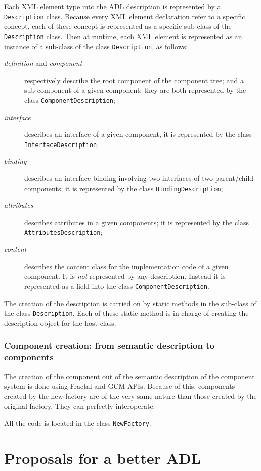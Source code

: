 \documentclass{article}
\newcommand{\code}[1]{\texttt{#1}}
\newcommand{\xml}[1]{\textsl{#1}}
\begin{document}
Each XML element type into the ADL description is represented by a  \code{Description} class.
Because every XML element declaration refer to a specific concept, each of these concept is represented
as a specific sub-class of the \code{Description} class.
Then at runtime, each XML element is represented as an instance of a sub-class of the class  \code{Description}, as follows:
\begin{description}
\item[\xml{definition} and \xml{component}] respectively describe  the root component of the component tree;
and a sub-component of a given component; they are both represented by the class \code{ComponentDescription};
\item[\xml{interface}] describes an interface of a given component, it is represented by the class \code{InterfaceDescription};
\item[\xml{binding}] describes an interface binding involving two interfaces of two parent/child components;
it is represented by the class \code{BindingDescription};
\item[\xml{attributes}] describes attributes in a given components; it is represented by the class \code{AttributesDescription};
\item[\xml{content}] describes the content class for the implementation code of a given component. It is
{\em not} represented by any description. Instead it is represented as a field into the class \code{ComponentDescription}.
\end{description}

The creation of the description is carried on by static methods in the sub-class of the class \code{Description}.
Each of these static method is in charge of creating the description object for the host class.

\subsubsection{Component creation: from semantic description to components}

The creation of the component out of the semantic description of the component system is done
using Fractal and GCM APIs. Because of this, components created by the new factory are of the very same
nature than those created by the original factory. They can perfectly interoperate.

All the code is located in the class \code{NewFactory}.


\section{Proposals for a better ADL}
\end{document}
